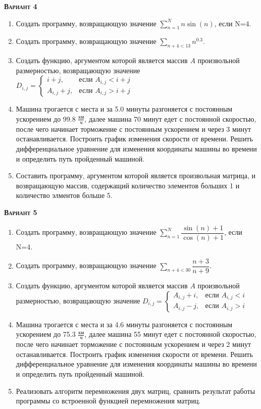 \textsc{\textbf{Вариант 4}}
\begin{enumerate}
\item  Создать программу, возвращающую значение $\sum\limits_{n=1}^{N} {n \sin(n)}                   $, если N=4. 
\item  Создать программу, возвращающую значение $\sum\limits_{n+4<      13} {n}^{0.3}                     $. 
\item Создать функцию, аргументом которой является массив $A$ произвольной размерностью, возвращающую значение $D_{i,j}=\begin{cases} i+j, & \text{если } {A_{i,j}}<i+j \\  A_{i,j}+j, & \text{если } {A_{i,j}}>i+j \end{cases}                              $ 
\item Машина трогается с места и за  5.0 минуты разгоняется с постоянным ускорением до 99.8 ${\frac{км}{ч}}$, далее машина   70 минут едет с постоянной скоростью, после чего начинает торможение с постоянным ускорением и через   3 минут останавливается. Построить график изменения скорости от времени. Решить дифференциальное уравнение для изменения координаты машины во времени и определить путь пройденный машиной.  \item Составить программу, аргументом которой является произвольная матрица, и возвращающую массив, содержащий количество элементов больших 1 и количество элментов больше 5.

\end{enumerate}
\textsc{\textbf{Вариант 5}}
\begin{enumerate}
\item  Создать программу, возвращающую значение $\sum\limits_{n=1}^{N} \dfrac{\sin(n)+1}{\cos(n)+1}  $, если N=4. 
\item  Создать программу, возвращающую значение $\sum\limits_{n+4<      30}  \dfrac{n+3}{n+9}             $. 
\item Создать функцию, аргументом которой является массив $A$ произвольной размерностью, возвращающую значение $D_{i,j}=\begin{cases} A_{i,j}+i, & \text{если } {A_{i,j}}<i \\  A_{i,j}-j, & \text{если } {A_{i,j}}>i \end{cases}                            $ 
\item Машина трогается с места и за  4.6 минуты разгоняется с постоянным ускорением до 75.3 ${\frac{км}{ч}}$, далее машина   55 минут едет с постоянной скоростью, после чего начинает торможение с постоянным ускорением и через   2 минут останавливается. Построить график изменения скорости от времени. Решить дифференциальное уравнение для изменения координаты машины во времени и определить путь пройденный машиной.  \item Реализовать алгоритм перемножения двух матриц, сравнить результат работы программы со встроенной функцией перемножения матриц.                                                                        

\end{enumerate}
